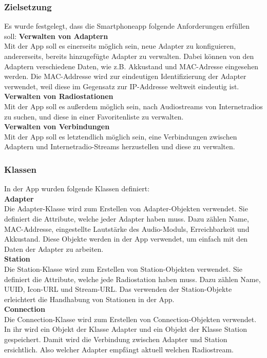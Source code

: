 \documentclass[11pt, twoside]{article}
\begin{document}
\subsubsection{Zielsetzung}
Es wurde festgelegt, dass die Smartphoneapp folgende Anforderungen erfüllen soll:
\vspace{4mm}\newline 
\textbf{Verwalten von Adaptern}  \\
Mit der App soll es einerseits möglich sein, neue Adapter zu konfiguieren, andererseits, bereits hinzugefügte Adapter zu verwalten. Dabei können von den Adaptern verschiedene Daten, wie z.B. Akkustand und MAC-Adresse eingesehen werden. Die MAC-Addresse wird zur eindeutigen Identifizierung der Adapter verwendet, weil diese im Gegensatz zur IP-Addresse weltweit eindeutig ist.
\vspace{4mm}\newline
\textbf{Verwalten von Radiostationen} \\
Mit der App soll es außerdem möglich sein, nach Audiostreams von Internetradios zu suchen, und diese in einer Favoritenliste zu verwalten. \newline \\
\textbf{Verwalten von Verbindungen} \\
Mit der App soll es letztendlich möglich sein, eine Verbindungen zwischen Adaptern und Internetradio-Streams herzustellen und diese zu verwalten.
\subsubsection{Klassen}
In der App wurden folgende Klassen definiert: \newline \\
\textbf{Adapter} \\
Die Adapter-Klasse wird zum Erstellen von Adapter-Objekten verwendet. Sie definiert die Attribute, welche jeder Adapter haben muss. Dazu zählen Name, MAC-Addresse, eingestellte Lautstärke des Audio-Moduls, Erreichbarkeit und Akkustand. Diese Objekte werden in der App verwendet, um einfach mit den Daten der Adapter zu arbeiten. \newline \\
\textbf{Station} \\
Die Station-Klasse wird zum Erstellen von Station-Objekten verwendet. Sie definiert die Attribute, welche jede Radiostation haben muss. Dazu zählen Name, UUID, Icon-URL und Stream-URL. Das verwenden der Station-Objekte erleichtert die Handhabung von Stationen in der App. \newline \\
\textbf{Connection} \\
Die Connection-Klasse wird zum Erstellen von Connection-Objekten verwendet. In ihr wird ein Objekt der Klasse Adapter und ein Objekt der Klasse Station gespeichert. Damit wird die Verbindung zwischen Adapter und Station ersichtlich. Also welcher Adapter empfängt aktuell welchen Radiostream. \newline \\
\end{document}
